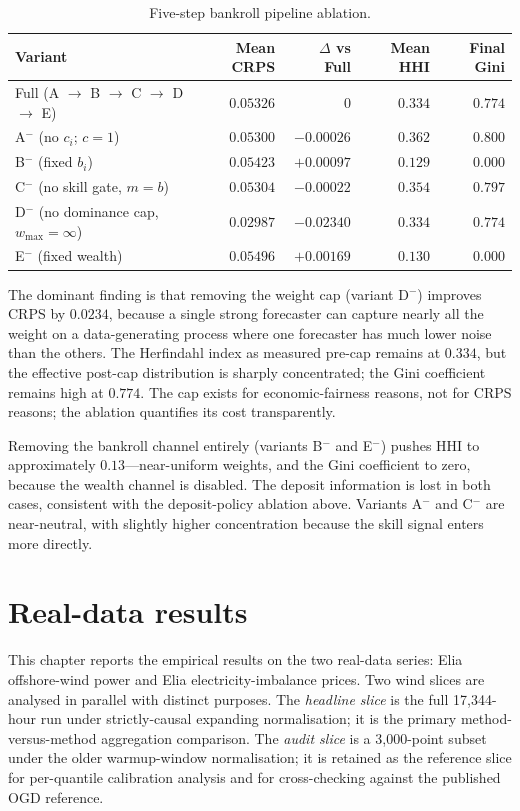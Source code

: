 \documentclass[
  11pt,
  a4paper,
  oneside]{report}
\begin{document}
\begin{table}[h]
\centering
\small
\begin{tabular}{lrrrr}
\toprule
Variant & Mean CRPS & $\Delta$ vs Full & Mean HHI & Final Gini \\
\midrule
Full (A $\to$ B $\to$ C $\to$ D $\to$ E)
  & $0.05326$ & $0$ & $0.334$ & $0.774$ \\
A$^-$ (no $c_i$; $c = 1$)
  & $0.05300$ & $-0.00026$ & $0.362$ & $0.800$ \\
B$^-$ (fixed $b_i$) & $0.05423$ & $+0.00097$ & $0.129$ & $0.000$ \\
C$^-$ (no skill gate, $m = b$)
  & $0.05304$ & $-0.00022$ & $0.354$ & $0.797$ \\
D$^-$ (no dominance cap, $w_{\max} = \infty$)
  & $0.02987$ & $-0.02340$ & $0.334$ & $0.774$ \\
E$^-$ (fixed wealth) & $0.05496$ & $+0.00169$ & $0.130$ & $0.000$ \\
\bottomrule
\end{tabular}
\caption{Five-step bankroll pipeline ablation.}
\label{tab:bankroll-ablation}
\end{table}

The dominant finding is that removing the weight cap (variant D\(^-\))
improves CRPS by \(0.0234\), because a single strong forecaster can
capture nearly all the weight on a data-generating process where one
forecaster has much lower noise than the others. The Herfindahl index as
measured pre-cap remains at \(0.334\), but the effective post-cap
distribution is sharply concentrated; the Gini coefficient remains high
at \(0.774\). The cap exists for economic-fairness reasons, not for CRPS
reasons; the ablation quantifies its cost transparently.

Removing the bankroll channel entirely (variants B\(^-\) and E\(^-\))
pushes HHI to approximately \(0.13\)---near-uniform weights, and the
Gini coefficient to zero, because the wealth channel is disabled. The
deposit information is lost in both cases, consistent with the
deposit-policy ablation above. Variants A\(^-\) and C\(^-\) are
near-neutral, with slightly higher concentration because the skill
signal enters more directly.

\chapter{Real-data results}\label{ch:real}

This chapter reports the empirical results on the two real-data series:
Elia offshore-wind power and Elia electricity-imbalance prices. Two wind
slices are analysed in parallel with distinct purposes. The
\emph{headline slice} is the full 17,344-hour run under strictly-causal
expanding normalisation; it is the primary method-versus-method
aggregation comparison. The \emph{audit slice} is a 3,000-point subset
under the older warmup-window normalisation; it is retained as the
reference slice for per-quantile calibration analysis and for
cross-checking against the published OGD reference.
\end{document}
